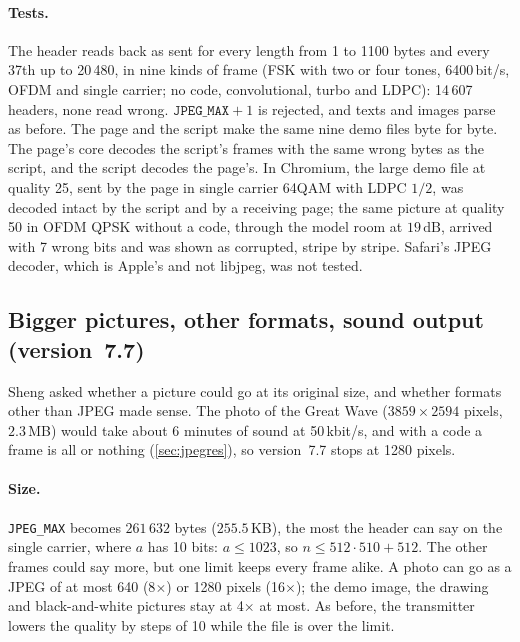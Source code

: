 \documentclass[11pt,a4paper]{article}
\newcommand{\dB}{\,\mathrm{dB}}
\newcommand{\code}[1]{\texttt{#1}}
\theoremstyle{remark}
\begin{document}
\paragraph{Tests.}
The header reads back as sent for every length from 1 to 1100 bytes and every 37th up to 20\,480, in nine kinds of frame (FSK with two or four tones, 6400\,bit/s, OFDM and single carrier; no code, convolutional, turbo and LDPC): 14\,607 headers, none read wrong. $\code{JPEG\_MAX} + 1$ is rejected, and texts and images parse as before.
The page and the script make the same nine demo files byte for byte. The page's core decodes the script's frames with the same wrong bytes as the script, and the script decodes the page's.
In Chromium, the large demo file at quality 25, sent by the page in single carrier 64QAM with LDPC $1/2$, was decoded intact by the script and by a receiving page; the same picture at quality 50 in OFDM QPSK without a code, through the model room at $19\dB$, arrived with 7 wrong bits and was shown as corrupted, stripe by stripe.
Safari's JPEG decoder, which is Apple's and not libjpeg, was not tested.

\subsection{Bigger pictures, other formats, sound output (version~7.7)}
\label{sec:jpeg77}
Sheng asked whether a picture could go at its original size, and whether formats other than JPEG made sense.
The photo of the Great Wave ($3859 \times 2594$ pixels, $2.3$\,MB) would take about 6 minutes of sound at 50\,kbit/s, and with a code a frame is all or nothing (\cref{sec:jpegres}), so version~7.7 stops at 1280 pixels.

\paragraph{Size.}
\code{JPEG\_MAX} becomes $261\,632$ bytes ($255.5$\,KB), the most the header can say on the single carrier, where $a$ has 10 bits: $a \le 1023$, so $n \le 512 \cdot 510 + 512$. The other frames could say more, but one limit keeps every frame alike.
A photo can go as a JPEG of at most 640 (8$\times$) or 1280 pixels (16$\times$); the demo image, the drawing and black-and-white pictures stay at 4$\times$ at most.
As before, the transmitter lowers the quality by steps of 10 while the file is over the limit.
\end{document}
